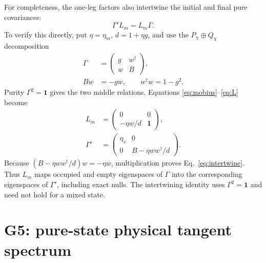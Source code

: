 \documentclass[aps,prx,twocolumn,superscriptaddress,longbibliography,nofootinbib,floatfix]{revtex4-2}
\newcommand{\Id}{\mathbf{1}}
\begin{document}
For completeness, the one-leg factors also intertwine the initial and final pure
covariances:
\begin{equation}
 \boxed{\Gamma' L_m=L_m\Gamma.}
 \label{eq:intertwine}
\end{equation}
To verify this directly, put $\eta=\eta_m$, $d=1+\eta g$, and use the
$P_\chi\oplus Q_\chi$ decomposition
\begin{align}
 \Gamma&=\begin{pmatrix}g&w^\dagger\\w&B\end{pmatrix},\nonumber\\
 Bw&=-gw,\qquad w^\dagger w=1-g^2.
 \label{eq:pure-block}
\end{align}
Purity $\Gamma^2=\Id$ gives the two middle relations.  Equations
\eqref{eq:mobius}--\eqref{eq:L} become
\begin{align}
 L_m&=\begin{pmatrix}0&0\\-\eta w/d&\Id\end{pmatrix},\nonumber\\
 \Gamma'&=\begin{pmatrix}\eta_s&0\\0&B-\eta ww^\dagger/d\end{pmatrix}.
 \label{eq:block-L}
\end{align}
Because $(B-\eta ww^\dagger/d)w=-\eta w$, multiplication proves
Eq.~\eqref{eq:intertwine}.  Thus $L_m$ maps occupied and empty eigenspaces of
$\Gamma$ into the corresponding eigenspaces of $\Gamma'$, including exact nulls.
The intertwining identity uses $\Gamma^2=\Id$ and need not hold for a mixed state.

\section{G5: pure-state physical tangent spectrum}
\end{document}
